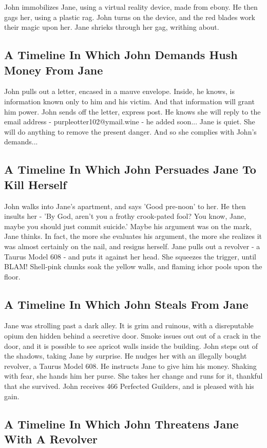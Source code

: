 \documentclass{article}
\begin{document}
John immobilizes Jane, using a virtual reality device, made from ebony.
He then gags her, using a plastic rag.
John turns on the device, and the red blades work their magic upon her.
Jane shrieks through her gag, writhing about.
\subsection{A Timeline In Which John Demands Hush Money From Jane}


John pulls out a letter, encased in a mauve envelope. Inside, he knows, is information known only to him and his victim. And that information will grant him power.
John sends off the letter, express post. He knows she will reply to the email address {-} purpleotter102@ymail.wine {-} he added soon...
Jane is quiet. She will do anything to remove the present danger. And so she complies with John's demands...
\subsection{A Timeline In Which John Persuades Jane To Kill Herself}


John walks into Jane's apartment, and says 'Good pre{-}noon' to her.
He then insults her {-} 'By God, aren't you a frothy crook{-}pated fool?
You know, Jane, maybe you should just commit suicide.'
Maybe his argument was on the mark, Jane thinks.
In fact, the more she evaluates his argument, the more she realizes it was almost certainly on the nail, and resigns herself.
Jane pulls out a revolver {-} a Taurus Model 608 {-} and puts it against her head.
She squeezes the trigger, until BLAM!
Shell{-}pink chunks soak the yellow walls, and flaming ichor pools upon the floor.
\subsection{A Timeline In Which John Steals From Jane}


Jane was strolling past a dark alley.
It is grim and ruinous, with a disreputable opium den hidden behind a secretive door.
Smoke issues out out of a crack in the door, and it is possible to see apricot walls inside the building.
John steps out of the shadows, taking Jane by surprise.
He nudges her with an illegally bought revolver, a Taurus Model 608.
He instructs Jane to give him his money.
Shaking with fear, she hands him her purse.
She takes her change and runs for it, thankful that she survived.
John receives 466 Perfected Guilders, and is pleased with his gain.
\subsection{A Timeline In Which John Threatens Jane With A Revolver}
\end{document}
